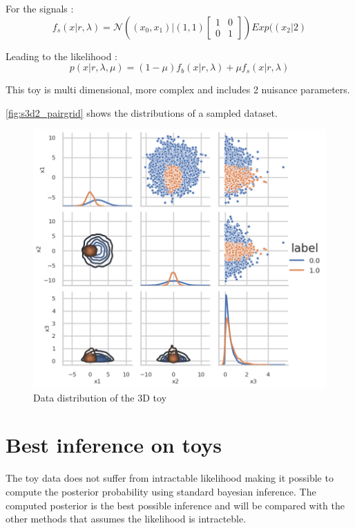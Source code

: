 For the signals :
$$
f_s (x|r, \lambda) = \mathcal N \left ( (x_0, x_1) | (1, 1) 
\begin{bmatrix} 1 & 0 \\ 0 & 1 \end{bmatrix} \right ) Exp((x_2| 2)
$$

Leading to the likelihood :
$$
p(x | r, \lambda, \mu ) = (1-\mu) f_b(x|r, \lambda) + \mu f_s(x|r, \lambda)
$$

This toy is multi dimensional, more complex and includes 2 nuisance parameters.

\autoref{fig:s3d2_pairgrid} shows the distributions of a sampled dataset.

\begin{figure}[htb]
    \includegraphics[width=\linewidth]{s3d2/pairgrid}
    \caption{Data distribution of the 3D toy}
    \label{fig:s3d2_pairgrid}
\end{figure}






\section{Best inference on toys} %
\label{sec:best_inference_on_toys}

The toy data does not suffer from intractable likelihood making it possible to compute the posterior probability using standard bayesian inference.
The computed posterior is the best possible inference and will be compared with the other methods that assumes the likelihood is intracteble.

